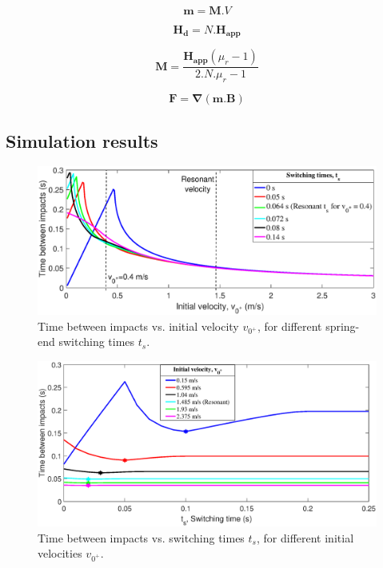 \documentclass[letterpaper, 10 pt, conference]{ieeeconf}  %
\begin{document}
\begin{equation}
\label{mag}
\mathbf{m}=\mathbf{M}.V
\end{equation}

\begin{equation}
\mathbf{H_d}=N.\mathbf{H_{app}}
\label{hd}
\end{equation}

\begin{equation}
\mathbf{M}=\frac{\mathbf{H_{app}}\left ( \mu_r-1  \right )}{2.N.\mu_r-1}
\label{mag2}
\end{equation}

\begin{equation}
\mathbf{F}=\mathbf{\nabla}(\mathbf{m}.\mathbf{B})
\label{force}
\end{equation}

\subsection{Simulation results}
\label{simulation_results}
\begin{figure}
	\includegraphics[width=\linewidth]{delTvsVop_R3.eps}
	\caption{Time between impacts vs. initial velocity $v_{0^+}$, for different spring-end switching times $t_s$.}
	\label{delTvsVop}
\end{figure}

\begin{figure}
	\includegraphics[width=\linewidth]{delTvsTs_R2.eps}
	\caption{Time between impacts vs. switching times $t_s$, for different initial velocities $v_{0^+}$.}
	\label{delTvsTs}
\end{figure}
\end{document}
